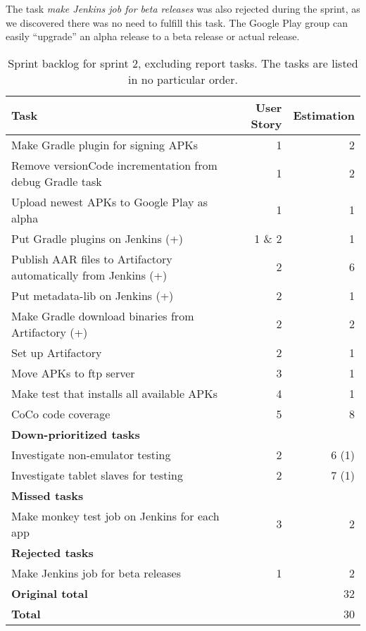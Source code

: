 The task \emph{make Jenkins job for beta releases} was also rejected during the sprint, as we discovered there was no need to fulfill this task. The Google Play group can easily ``upgrade'' an alpha release to a beta release or actual release.

\begin{table}%
  \centering
  \begin{tabular}{p{}rr}
    \toprule
    \textbf{Task} & \textbf{User Story} & \textbf{Estimation} \\
    \midrule
    Make Gradle plugin for signing APKs                            & 1      & 2 \\
    Remove versionCode incrementation from debug Gradle task       & 1      & 2 \\
    Upload newest APKs to Google Play as alpha                     & 1      & 1 \\
    Put Gradle plugins on Jenkins (+)                              & 1 \& 2 & 1 \\
    Publish AAR files to Artifactory automatically from Jenkins (+)& 2      & 6 \\
    Put metadata-lib on Jenkins (+)                                & 2      & 1 \\
    Make Gradle download binaries from Artifactory (+)             & 2      & 2 \\
    Set up Artifactory                                             & 2      & 1 \\
    Move APKs to ftp server                                        & 3      & 1 \\
    Make test that installs all available APKs                     & 4      & 1 \\
    CoCo code coverage                                             & 5      & 8 \\
    \midrule
    \textbf{Down-prioritized tasks} & & \\
    \midrule
    Investigate non-emulator testing                               & 2      & 6 (1) \\
    Investigate tablet slaves for testing                          & 2      & 7 (1) \\
    \midrule
    \textbf{Missed tasks} & & \\
    \midrule
    Make monkey test job on Jenkins for each app                   & 3      & 2 \\
    \midrule
    \textbf{Rejected tasks} & & \\
    \midrule
    Make Jenkins job for beta releases                             & 1      & 2 \\
    \midrule
    \textbf{Original total} & & 32 \\
    \textbf{Total} & & 30 \\
    \bottomrule
  \end{tabular}
\caption[Sprint 2 backlog]{Sprint backlog for sprint 2, excluding report tasks. The tasks are listed in no particular order.}
\label{tab:sprint2_tasks}
\end{table}